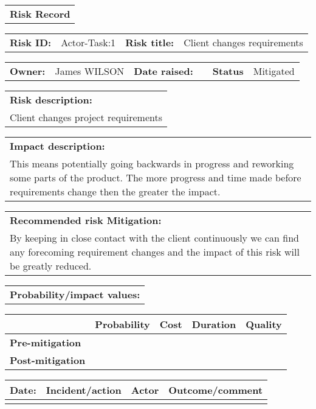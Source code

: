 \begin{table}
	\begin{tabularx}{\textwidth}{| X |}
		\hline
		\textbf{Risk Record} \\
	\end{tabularx}
	\begin{tabularx}{\textwidth}{| l | X | l | X |}
		\hline
		\textbf{Risk ID:} & Actor-Task:1 & \textbf{Risk title:} & Client changes requirements  \\
	\end{tabularx}
	\begin{tabularx}{\textwidth}{| l | X | l | X | l | X |}
		\hline
		\textbf{Owner:} & James WILSON & \textbf{Date raised:} &  & \textbf{Status} & Mitigated \\
	\end{tabularx}
	\begin{tabularx}{\textwidth}{| X |}
		\hline
		\textbf{Risk description:} \\ Client changes project requirements  \\
	\end{tabularx}
	\begin{tabularx}{\textwidth}{| X |}
		\hline
		\textbf{Impact description:} \\ This means potentially going backwards in progress and reworking some parts of the product. The more progress and time made before requirements change then the greater the impact. \\
	\end{tabularx}
	\begin{tabularx}{\textwidth}{| X |}
		\hline
		\textbf{Recommended risk Mitigation:} \\ By keeping in close contact with the client continuously we can find any forecoming requirement changes and the impact of this risk will be greatly reduced. \\
	\end{tabularx}
	\begin{tabularx}{\textwidth}{| X |}
		\hline
		\textbf{Probability/impact values:} \\
	\end{tabularx}
	\begin{tabularx}{\textwidth}{| l | l | X | X | X |}
		\hline
		 &  \textbf{Probability} & \textbf{Cost} & \textbf{Duration} & \textbf{Quality} \\ \hline
		\textbf{Pre-mitigation} &  &  &  &  \\ \hline
		\textbf{Post-mitigation} &  &  &  &  \\ \hline \hline
	\end{tabularx}
	\begin{tabularx}{\textwidth}{| l | X | l | X |}
		\hline
		\textbf{Date:} & \textbf{Incident/action} & \textbf{Actor} & \textbf{Outcome/comment} \\ \hline
		 &  &  &  \\ \hline
	\end{tabularx}%
\end{table}

